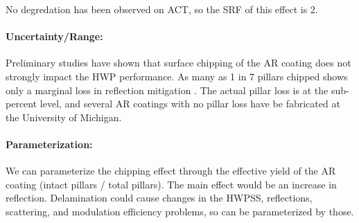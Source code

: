 No degredation has been observed on ACT, so the SRF of this effect is 2.


\paragraph{Uncertainty/Range:}


Preliminary studies have shown that surface chipping of the AR coating does not strongly impact the HWP performance. As many as 1 in 7 pillars chipped shows only a marginal loss in reflection mitigation \cite{SiAR_1}. The actual pillar loss is at the sub-percent level, and several AR coatings with no pillar loss have be fabricated at the University of Michigan.


\paragraph{Parameterization:}
We can parameterize the chipping effect through the effective yield of the AR coating (intact pillars / total pillars). The main effect would be an increase in reflection. Delamination could cause changes in the HWPSS, reflections, scattering, and modulation efficiency problems, so can be parameterized by those.
